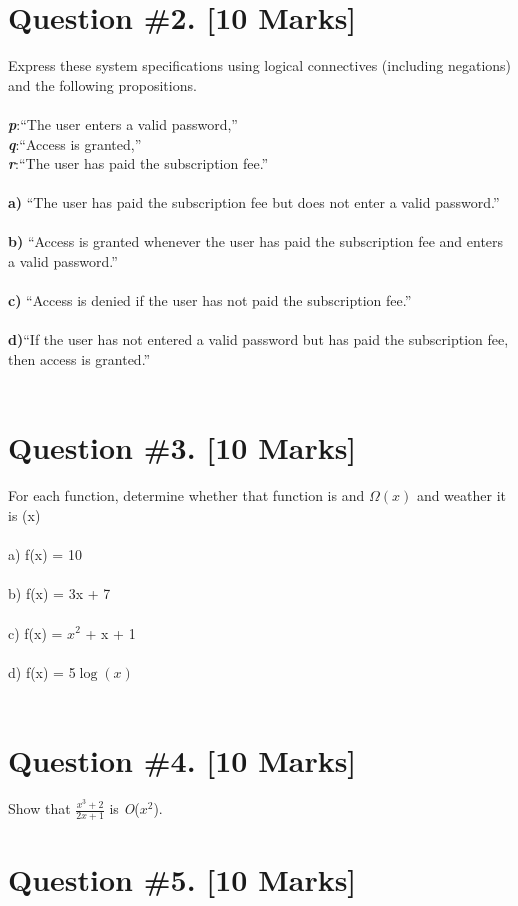 \documentclass{article}
\begin{document}
\section{Question \#2. [10 Marks]}
Express these system specifications using logical connectives (including negations) and the following propositions.
\\\\
\textit{\textbf p}:“The user enters a valid password,” \\
\textit{\textbf q}:“Access is granted,” \\
\textit{\textbf r}:“The user has paid the subscription fee.” \\ \\ 
\textbf {a)} “The user has paid the subscription fee but does not enter a valid password.” \\\\
\textbf {b)} “Access is granted whenever the user has paid the subscription fee and enters a valid password.”\\\\
\textbf {c)} “Access is denied if the user has not paid the subscription fee.”\\\\
\textbf {d)}“If the user has not entered a valid password but has paid the subscription fee, then access is granted.”\\\\
\newpage
\section{Question \#3. [10 Marks]}
For each function, determine whether that function is and $\Omega(x)$ and weather it is (x)\\ \\
a) f(x) = 10 \\ \\ 
b) f(x) = 3x + 7 \\ \\ 
c) f(x) = $x^2$ + x + 1 \\  \\ 
d) f(x) = 5$\log(x)$ \\ \\ 
\newpage

\section{Question \#4. [10 Marks]}
Show that $\frac{x^3 + 2}{2x + 1}$ is \emph{O}($x^2$).
\newpage
\section{Question \#5. [10 Marks]}
\end{document}
